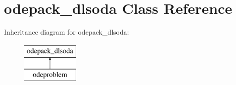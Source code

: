 \hypertarget{classodepack__dlsoda}{}\section{odepack\+\_\+dlsoda Class Reference}
\label{classodepack__dlsoda}
Inheritance diagram for odepack\+\_\+dlsoda\+:\begin{figure}[H]
\begin{center}
\leavevmode
\includegraphics[height=2.000000cm]{classodepack__dlsoda}
\end{center}
\end{figure}
